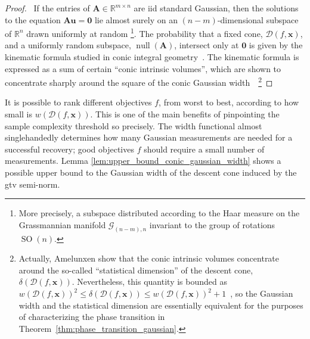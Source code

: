 \clearpage

\begin{proof}
    \pfsketch\ If the entries of $\mathbf{A} \in \mathbb{R}^{m \times n}$ are \acrshort{iid} standard Gaussian, then the solutions to the equation $\mathbf{A u} = \mathbf{0}$ lie almost surely on an $(n - m)$-dimensional subspace of $\mathbb{R}^{n}$ drawn uniformly at random \footnote{More precisely, a subspace distributed according to the Haar measure on the Grassmannian manifold $\mathcal{G}_{(n-m),n}$ invariant to the group of rotations $\operatorname{SO}(n)$.}. The probability that a fixed cone, $\mathcal{D}(f, \mathbf{x})$, and a uniformly random subspace, $\operatorname{null} \left ( \mathbf{A} \right )$, intersect only at $\mathbf{0}$ is given by the kinematic formula studied in conic integral geometry~\cite{schneider2008}. The kinematic formula is expressed as a sum of certain ``conic intrinsic volumes'', which are shown to concentrate sharply around the square of the conic Gaussian width~\cite{amelunxen2014}~\footnote{Actually, Amelunxen \etal show that the conic intrinsic volumes concentrate around the so-called ``statistical dimension'' of the descent cone, $\delta(\mathcal{D}(f, \mathbf{x}))$. Nevertheless, this quantity is bounded as $w(\mathcal{D}(f, \mathbf{x}))^2 \leq \delta(\mathcal{D}(f, \mathbf{x})) \leq w(\mathcal{D}(f, \mathbf{x}))^2 + 1$~\cite[Prop. 10.2]{amelunxen2014}, so the Gaussian width and the statistical dimension are essentially equivalent for the purposes of characterizing the phase transition in Theorem~\ref{thm:phase_transition_gaussian}.}
\end{proof}

It is possible to rank different objectives $f$, from worst to best, according to how small is $w(\mathcal{D}(f, \mathbf{x}))$. This is one of the main benefits of pinpointing the sample complexity threshold so precisely. The width functional almost singlehandedly determines how many Gaussian measurements are needed for a successful recovery; good objectives $f$ should require a small number of measurements. Lemma \ref{lem:upper_bound_conic_gaussian_width} shows a possible upper bound to the Gaussian width of the descent cone induced by the \acrshort{gtv} semi-norm.

